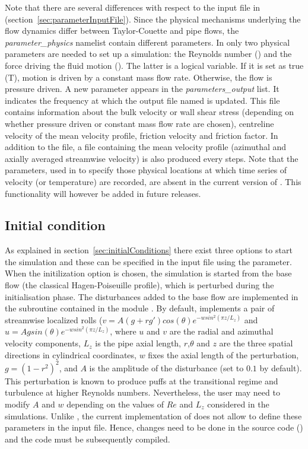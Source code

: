 \documentclass[a4paper, 11pt, DIV=11]{scrartcl}
\begin{document}
Note that there are several differences with respect to the input file  in \nsc
(section~\ref{sec:parameterInputFile}). Since the physical mechanisms underlying
the flow dynamics differ between Taylor-Couette and pipe flows, the
\emph{parameter\_physics} namelist contain different parameters. In \nsp only two
physical parameters are needed to set up a simulation: the Reynolds number () and
the force driving the fluid motion (). The latter is a logical variable.
If it is set as true (T), motion is driven by a constant mass flow rate. Otherwise,
the flow is pressure driven. A new parameter  appears in the
\emph{parameters\_output} list. It indicates the frequency at which the output file named
 is updated. This file contains information about the bulk velocity or wall shear
stress (depending on whether pressure driven or constant mass flow rate are chosen), centreline
velocity of the mean velocity profile, friction velocity and friction factor. In addition to
the  file, a file containing the mean velocity profile (\ie azimuthal and axially
averaged streamwise velocity) is also produced every  steps. Note that the
 parameters,  used in \nsc to specify those physical locations at which time
series of velocity (or temperature) are recorded, are absent in the current version of \nsp.
This functionality will however be added in future releases.

\subsection{Initial condition}
\label{subsec:initial_condition_pipe}
\color{red}
As explained in section~\ref{sec:initialConditions} there exist three options to start
the simulation and these can be specified in the input file using the  parameter.
When the initilization option  is chosen, the simulation is started from
the base flow (the classical Hagen-Poiseuille profile), which is perturbed during the
initialisation phase. The disturbances added to the base flow are implemented in the subroutine
 contained in the module . By default,
\nsp implements a pair of streamwise localized rolls ($v=A(g+rg') cos(\theta) e^{-wsin^2(\pi z/L_z)}$ and
$u=A g sin(\theta) e^{-wsin^2(\pi z/L_z)}$, where $u$ and $v$ are the
radial and azimuthal velocity components, $L_z$ is the pipe axial length,
$r$,$\theta$ and $z$ are the three spatial directions in cylindrical
coordinates, $w$ fixes the axial length of the perturbation,
$g=(1-r^2)^2$,  and $A$ is the amplitude of the
disturbance (set to $0.1$ by default). This perturbation is known to produce puffs at the
transitional regime and turbulence at higher Reynolds numbers.
Nevertheless, the user may need to modify $A$ and $w$
depending on the values of $Re$ and $L_z$ considered in the simulations.
Unlike \nsc, the current implementation of \nsp does not allow
to define these parameters in the input file. Hence, changes need
to be done in the source code () and the
code must be subsequently compiled.
\end{document}
